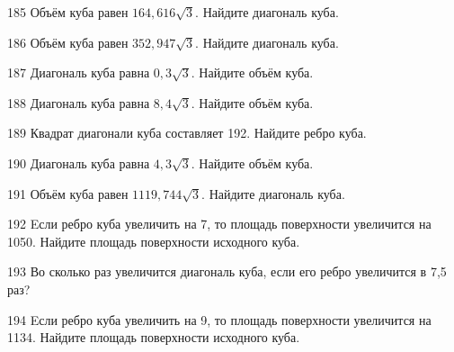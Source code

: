 \begin{taskBN}{185}
Объём куба равен $164,616\sqrt{3}$. Найдите диагональ куба.
\end{taskBN}

\begin{taskBN}{186}
Объём куба равен $352,947\sqrt{3}$. Найдите диагональ куба.
\end{taskBN}

\begin{taskBN}{187}
Диагональ куба равна $0,3\sqrt{3}$. Найдите объём куба.
\end{taskBN}

\begin{taskBN}{188}
Диагональ куба равна $8,4\sqrt{3}$. Найдите объём куба.
\end{taskBN}

\begin{taskBN}{189}
Квадрат диагонали куба составляет 192. Найдите ребро куба.
\end{taskBN}

\begin{taskBN}{190}
Диагональ куба равна $4,3\sqrt{3}$. Найдите объём куба.
\end{taskBN}

\begin{taskBN}{191}
Объём куба равен $1119,744\sqrt{3}$. Найдите диагональ куба.
\end{taskBN}

\begin{taskBN}{192}
Eсли ребро куба увеличить на 7, то площадь поверхности увеличится на 1050. Найдите площадь поверхности исходного куба.
\end{taskBN}

\begin{taskBN}{193}
Во сколько раз увеличится диагональ куба, если его ребро увеличится в 7,5 раз?
\end{taskBN}

\begin{taskBN}{194}
Eсли ребро куба увеличить на 9, то площадь поверхности увеличится на 1134. Найдите площадь поверхности исходного куба.
\end{taskBN}

